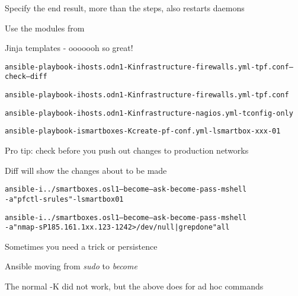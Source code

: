 \documentclass[18pt,landscape,a4paper,footrule]{foils}
\begin{document}
\begin{list2}
\item Specify the end result, more than the steps, also restarts daemons
\item Use the modules from\\
\item Jinja templates - ooooooh so great!
\end{list2}


\begin{alltt}\footnotesize
ansible-playbook -i hosts.odn1 -K infrastructure-firewalls.yml -t pf.conf --check --diff

ansible-playbook -i hosts.odn1 -K infrastructure-firewalls.yml -t pf.conf

ansible-playbook -i hosts.odn1 -K infrastructure-nagios.yml -t config-only

ansible-playbook -i smartboxes -K create-pf-conf.yml -l smartbox-xxx-01
\end{alltt}

\begin{list2}
\item Pro tip: check before you push out changes to production networks \smiley
\item Diff will show the changes about to be made
\end{list2}


\begin{alltt}\footnotesize
ansible -i ../smartboxes.osl1 --become --ask-become-pass -m shell
-a "pfctl -s rules" -l smartbox01

ansible -i ../smartboxes.osl1 --become --ask-become-pass -m shell
-a "nmap -sP 185.161.1xx.123-124 2> /dev/null| grep done" all
\end{alltt}

\begin{list2}
\item Sometimes you need a trick or persistence
\item Ansible moving from \emph{sudo} to \emph{become}
\item The normal -K did not work, but the above does for ad hoc commands
\end{list2}



\end{document}
